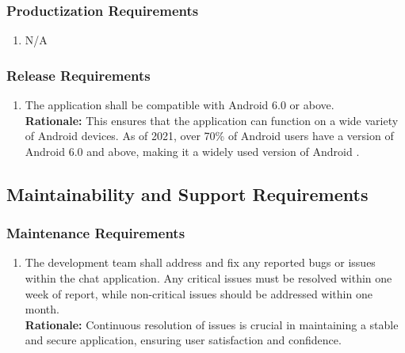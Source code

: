 \documentclass[]{article}
\begin{document}

\subsubsection{Productization Requirements}
\label{ssub:productization_requirements}
\begin{enumerate}[{OE-P}1. ]
	\item N/A
\end{enumerate}

\subsubsection{Release Requirements}
\label{ssub:release_requirements}
\begin{enumerate}[{OE-R}1. ]
	\item The application shall be compatible with Android 6.0 or above. \\
	{\bf Rationale:} This ensures that the application can function on a wide variety of Android devices.
	As of 2021, over 70\% of Android users have a version of Android 6.0 and above, making it a widely
	used version of Android \cite{8c}.
\end{enumerate}




\subsection{Maintainability and Support Requirements}
\label{sub:maintainability_and_support_requirements}

\subsubsection{Maintenance Requirements}
\label{ssub:maintenance_requirements}
\begin{enumerate}[{MS-M}1. ]
	\item The development team shall address and fix any reported bugs or issues within the chat application.
	Any critical issues must be resolved within one week of report, while non-critical issues should be addressed within one month. \\
	{\bf Rationale:} Continuous resolution of issues is crucial in maintaining a stable and secure application,
	ensuring user satisfaction and confidence.
\end{enumerate}
\end{document}
